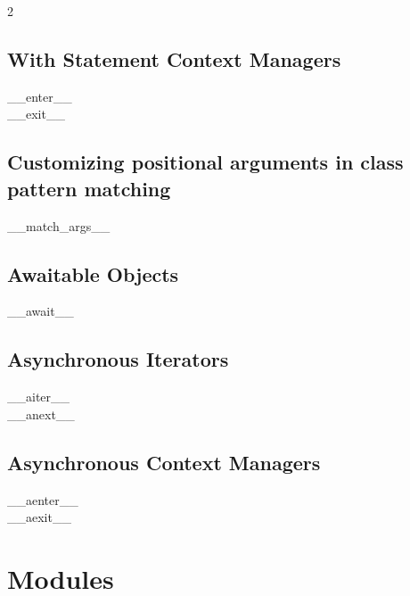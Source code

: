 \documentclass [8pt] {extarticle}
\begin{document}
    \begin {multicols} {2}
    \subsection {With Statement Context Managers}

    \_\_enter\_\_ \\
    \_\_exit\_\_ \\

    \subsection {Customizing positional arguments in class pattern matching}

    \_\_match\_args\_\_ \\

    \subsection {Awaitable Objects}

    \_\_await\_\_ \\

    \subsection {Asynchronous Iterators}

    \_\_aiter\_\_ \\
    \_\_anext\_\_ \\

    \subsection {Asynchronous Context Managers}

    \_\_aenter\_\_ \\
    \_\_aexit\_\_ \\
    \end {multicols}

    \pagebreak

    \section {Modules}
\end{document}
